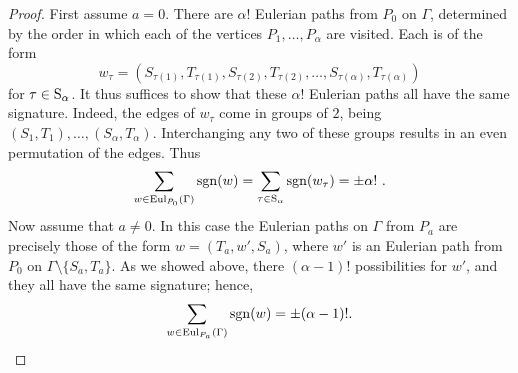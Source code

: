 \documentclass{amsproc}
\theoremstyle{definition}
\theoremstyle{remark}
\numberwithin{equation}{section}
\newcommand{\Sym}{{\rm S}}
\newcommand{\sgn}{{\rm sgn}}
\newcommand{\indeg}{{\rm indeg}}
\newcommand{\uni}{{\rm Eul}}
\begin{document}
\begin{proof}
First assume $a = 0$. There are $\alpha!$ Eulerian paths from $P_0$ on $\Gamma$, determined by the order in which each of the vertices $P_1, \ldots, P_{\alpha}$ are visited. Each is of the form
\[w_\tau=(S_{\tau(1)},T_{\tau(1)},S_{\tau(2)},T_{\tau(2)},\dots,S_{\tau(\alpha)},T_{\tau(\alpha)})\]
for $\tau\in \Sym_{\alpha}$.
It thus suffices to show that these $\alpha!$ Eulerian paths all have the same signature. Indeed,
the edges of $w_\tau$ come in groups of $2$, being $(S_1,T_1), \dots, (S_\alpha,T_\alpha)$. Interchanging any two of these groups 
results in an even permutation of the edges. Thus 
\[\sum_{w\in \uni_{P_0}(\Gamma)}\sgn(w)=\sum_{\tau\in\Sym_{\alpha}}\sgn(w_\tau)=\pm \alpha!\ . \]
Now assume that $a\neq 0$. In this case the Eulerian paths on $\Gamma$ from $P_a$ are precisely those of the form
$w=(T_a,w',S_a)$,
where $w'$ is an Eulerian path from $P_0$ on $\Gamma\setminus\{S_a,T_a\}$. As we showed above, there $(\alpha - 1)!$
possibilities for $w'$, and they all have the same signature; hence,
\[  \displaystyle \sum_{w\in \uni_{P_a}(\Gamma)}\sgn(w)= \pm (\alpha-1)!. \]
\end{proof}
\end{document}
